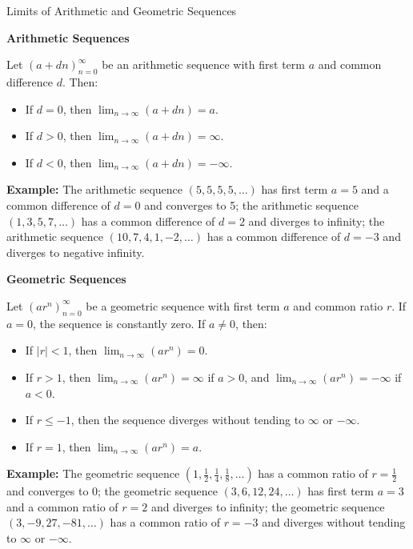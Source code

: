 \documentclass{article}
\begin{document}
\begin{calloutbox}{Limits of Arithmetic and Geometric Sequences}\label{box:arithmetic-geometric-limits}
    \medskip

    \par\noindent\textbf{Arithmetic Sequences}\par
    Let \((a+dn)_{n=0}^\infty\) be an arithmetic sequence with first term \(a\) and common difference \(d\). Then:
    \begin{itemize}
        \item If \(d = 0\), then \(\lim_{n \to \infty} (a+dn) = a\).
        \item If \(d > 0\), then \(\lim_{n \to \infty} (a+dn) = \infty\).
        \item If \(d < 0\), then \(\lim_{n \to \infty} (a+dn) = -\infty\).
    \end{itemize}
        
    \textbf{Example:} The arithmetic sequence \((5, 5, 5, 5, \ldots)\) has first term \(a = 5\) and a common difference of \(d = 0\) and converges to 5; the arithmetic sequence \((1, 3, 5, 7, \ldots)\) has a common difference of \(d = 2\) and diverges to infinity; the arithmetic sequence \((10, 7, 4, 1, -2, \ldots)\) has a common difference of \(d = -3\) and diverges to negative infinity.

    \medskip

    \noindent\textbf{Geometric Sequences}\par
    Let \((ar^n)_{n=0}^\infty\) be a geometric sequence with first term \(a\) and common ratio \(r\). If \(a = 0\), the sequence is constantly zero. If \(a \neq 0\), then:
    \begin{itemize}
        \item If \(|r| < 1\), then \(\lim_{n \to \infty} (ar^n) = 0\).
        \item If \(r > 1\), then \(\lim_{n \to \infty} (ar^n) = \infty\) if \(a > 0\), and \(\lim_{n \to \infty} (ar^n) = -\infty\) if \(a < 0\).
        \item If \(r \le -1\), then the sequence diverges without tending to \(\infty\) or \(-\infty\).
        \item If \(r = 1\), then \(\lim_{n \to \infty} (ar^n) = a\).
    \end{itemize}

    \textbf{Example:} The geometric sequence \((1, \frac{1}{2}, \frac{1}{4}, \frac{1}{8}, \ldots)\) has a common ratio of \(r = \frac{1}{2}\) and converges to 0; the geometric sequence \((3, 6, 12, 24, \ldots)\) has first term \(a = 3\) and a common ratio of \(r = 2\) and diverges to infinity; the geometric sequence \((3, -9, 27, -81, \ldots)\) has a common ratio of \(r = -3\) and diverges without tending to \(\infty\) or \(-\infty\).
\end{calloutbox}
\end{document}
